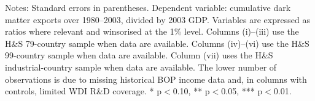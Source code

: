 \documentclass[11pt]{article}
\begin{document}
\small
\setcounter{table}{2}
\begin{table}[htbp]
\centering
\caption{Sources of Dark Matter: Cross-Section Evidence, columns (i)--(iii)}
\label{tab:table3a}
\scriptsize
{}
\begin{minipage}{0.95\linewidth}
\footnotesize Notes: Standard errors in parentheses. Dependent variable: cumulative dark matter exports over 1980--2003, divided by 2003 GDP. Variables are expressed as ratios where relevant and winsorised at the 1\% level. Columns (i)--(iii) use the H\&S 79-country sample when data are available. Columns (iv)--(vi) use the H\&S 99-country sample when data are available. Column (vii) uses the H\&S industrial-country sample when data are available. The lower number of observations is due to missing historical BOP income data and, in columns with controls, limited WDI R\&D coverage. * p$<$0.10, ** p$<$0.05, *** p$<$0.01.
\end{minipage}
\end{table}
\end{document}
